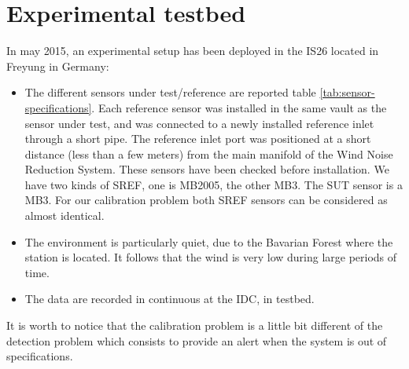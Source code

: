  \newpage\clearpage
\section{Experimental testbed}
In may 2015, an experimental setup has been deployed in the IS26 located in Freyung in Germany:
\begin{itemize}
\item
The different sensors under test/reference are reported table \ref{tab:sensor-specifications}. Each reference sensor was installed in the same vault as the sensor under test, and was connected to a newly installed reference inlet through a short pipe. The reference inlet port was positioned at a short distance (less than a few meters) from the main manifold of the Wind Noise Reduction System. 
These sensors have been checked before installation. We have two kinds of SREF, one is MB2005, the other MB3. The SUT sensor is a MB3. For our calibration problem both SREF sensors can be considered as almost identical.
\item
The environment is particularly  quiet, due to the Bavarian Forest where the station is located. It follows that the wind is very low during large periods of time.

 \item
The data are recorded in continuous at the IDC, in testbed.
\end{itemize}

It is worth to notice that the calibration problem is a little bit different of the detection problem which consists to provide an alert when the system is out of specifications.


